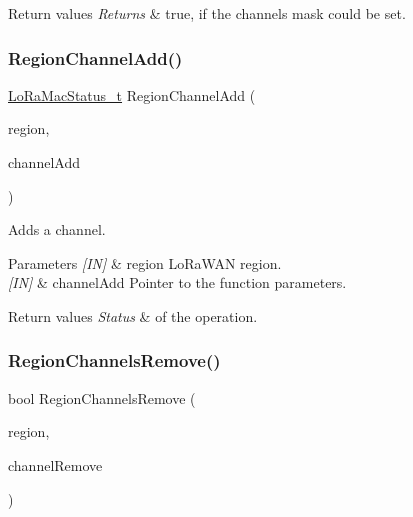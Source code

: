 \begin{DoxyRetVals}{Return values}
{\em Returns} & true, if the channels mask could be set. \\
\hline
\end{DoxyRetVals}
\mbox{\label{group__REGION_gaaa5767f33e988a641abf509ad278ae14}} 
\subsubsection{\texorpdfstring{Region\+Channel\+Add()}{RegionChannelAdd()}}
{\footnotesize\ttfamily \hyperlink{group__LORAMAC_ga30bd25657e10480f8605ee951b0ecfbd}{Lo\+Ra\+Mac\+Status\+\_\+t} Region\+Channel\+Add (\begin{DoxyParamCaption}\item[{\hyperlink{group__LORAMAC_ga80c48efda9ae02e14b58160d34a798dd}{Lo\+Ra\+Mac\+Region\+\_\+t}}]{region,  }\item[{\hyperlink{group__REGION_gab1c5f3aa06614283202906cef4417860}{Channel\+Add\+Params\+\_\+t} $\ast$}]{channel\+Add }\end{DoxyParamCaption})}



Adds a channel. 


\begin{DoxyParams}{Parameters}
{\em \mbox{[}\+I\+N\mbox{]}} & region Lo\+Ra\+W\+AN region.\\
\hline
{\em \mbox{[}\+I\+N\mbox{]}} & channel\+Add Pointer to the function parameters.\\
\hline
\end{DoxyParams}

\begin{DoxyRetVals}{Return values}
{\em Status} & of the operation. \\
\hline
\end{DoxyRetVals}
\mbox{\label{group__REGION_ga50b3505e13d8373fef6e2be6d48e150c}} 
\subsubsection{\texorpdfstring{Region\+Channels\+Remove()}{RegionChannelsRemove()}}
{\footnotesize\ttfamily bool Region\+Channels\+Remove (\begin{DoxyParamCaption}\item[{\hyperlink{group__LORAMAC_ga80c48efda9ae02e14b58160d34a798dd}{Lo\+Ra\+Mac\+Region\+\_\+t}}]{region,  }\item[{\hyperlink{group__REGION_gaa37468560d2fc81a977b57a48e5d72c0}{Channel\+Remove\+Params\+\_\+t} $\ast$}]{channel\+Remove }\end{DoxyParamCaption})}



